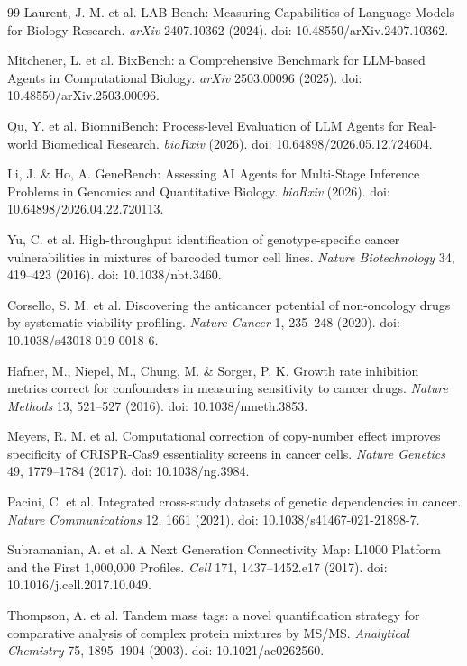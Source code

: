 {\begin{thebibliography}{99}
 Laurent, J. M. et al. LAB-Bench: Measuring Capabilities
of Language Models for Biology Research. \textit{arXiv} 2407.10362 (2024). doi:
10.48550/arXiv.2407.10362.

 Mitchener, L. et al. BixBench: a Comprehensive Benchmark
for LLM-based Agents in Computational Biology. \textit{arXiv} 2503.00096
(2025). doi: 10.48550/arXiv.2503.00096.

 Qu, Y. et al. BiomniBench: Process-level Evaluation
of LLM Agents for Real-world Biomedical Research. \textit{bioRxiv} (2026). doi:
10.64898/2026.05.12.724604.

 Li, J. \& Ho, A. GeneBench: Assessing AI Agents for
Multi-Stage Inference Problems in Genomics and Quantitative Biology.
\textit{bioRxiv} (2026). doi: 10.64898/2026.04.22.720113.

 Yu, C. et al. High-throughput identification of
genotype-specific cancer vulnerabilities in mixtures of barcoded tumor cell
lines. \textit{Nature Biotechnology} 34, 419--423 (2016). doi:
10.1038/nbt.3460.

 Corsello, S. M. et al. Discovering the anticancer
potential of non-oncology drugs by systematic viability profiling. \textit{Nature
Cancer} 1, 235--248 (2020). doi: 10.1038/s43018-019-0018-6.

 Hafner, M., Niepel, M., Chung, M. \& Sorger, P. K. Growth
rate inhibition metrics correct for confounders in measuring sensitivity to
cancer drugs. \textit{Nature Methods} 13, 521--527 (2016). doi:
10.1038/nmeth.3853.

 Meyers, R. M. et al. Computational correction of
copy-number effect improves specificity of CRISPR-Cas9 essentiality screens in
cancer cells. \textit{Nature Genetics} 49, 1779--1784 (2017). doi:
10.1038/ng.3984.

 Pacini, C. et al. Integrated cross-study datasets of
genetic dependencies in cancer. \textit{Nature Communications} 12, 1661 (2021).
doi: 10.1038/s41467-021-21898-7.

 Subramanian, A. et al. A Next Generation Connectivity
Map: L1000 Platform and the First 1,000,000 Profiles. \textit{Cell} 171,
1437--1452.e17 (2017). doi: 10.1016/j.cell.2017.10.049.

 Thompson, A. et al. Tandem mass tags: a novel
quantification strategy for comparative analysis of complex protein mixtures by
MS/MS. \textit{Analytical Chemistry} 75, 1895--1904 (2003). doi:
10.1021/ac0262560.


\end{thebibliography}}

